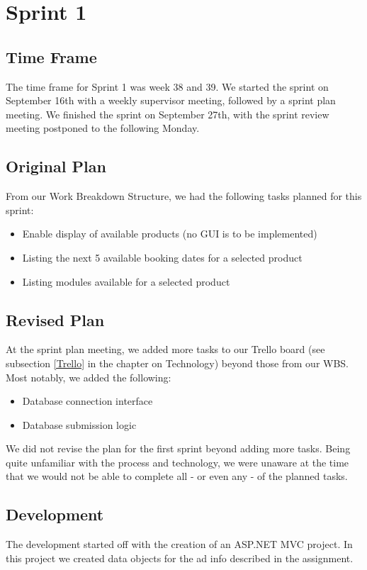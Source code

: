 \section{Sprint 1}

\subsection{Time Frame}
The time frame for Sprint 1 was week 38 and 39. We started the sprint on September 16th with a weekly supervisor meeting, followed by a sprint plan meeting. We finished the sprint on September 27th, with the sprint review meeting postponed to the following Monday.

\subsection{Original Plan}
From our Work Breakdown Structure, we had the following tasks planned for this sprint:
\begin{itemize}
	\item Enable display of available products (no GUI is to be implemented)
	\item Listing the next 5 available booking dates for a selected product
	\item Listing modules available for a selected product
\end{itemize}

\subsection{Revised Plan}
At the sprint plan meeting, we added more tasks to our Trello board (see subsection \ref{Trello} in the chapter on Technology) beyond those from our WBS. Most notably, we added the following:
\begin{itemize}
	\item Database connection interface
	\item Database submission logic
\end{itemize}

We did not revise the plan for the first sprint beyond adding more tasks. Being quite unfamiliar with the process and technology, we were unaware at the time that we would not be able to complete all - or even any - of the planned tasks.

\subsection{Development}
The development started off with the creation of an ASP.NET MVC project. In this project we created data objects for the ad info described in the assignment.

